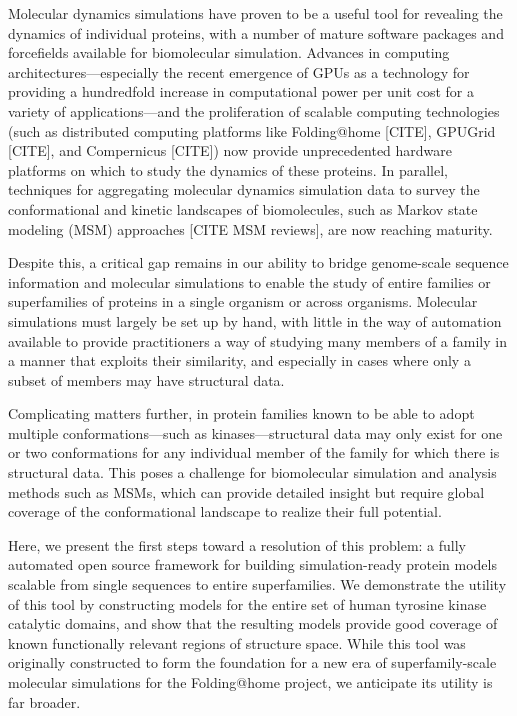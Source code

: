 \documentclass[aps,pre,twocolumn,nofootinbib,superscriptaddress,linenumbers]{revtex4-1}
\begin{document}
Molecular dynamics simulations have proven to be a useful tool for revealing the dynamics of individual proteins, with a number of mature software packages and forcefields available for biomolecular simulation.
Advances in computing architectures---especially the recent emergence of GPUs as a technology for providing a hundredfold increase in computational power per unit cost for a variety of applications---and the proliferation of scalable computing technologies (such as distributed computing platforms like Folding@home [CITE], GPUGrid [CITE], and Compernicus [CITE]) now provide unprecedented hardware platforms on which to study the dynamics of these proteins.
In parallel, techniques for aggregating molecular dynamics simulation data to survey the conformational and kinetic landscapes of biomolecules, such as Markov state modeling (MSM) approaches [CITE MSM reviews], are now reaching maturity.

Despite this, a critical gap remains in our ability to bridge genome-scale sequence information and molecular simulations to enable the study of entire families or superfamilies of proteins in a single organism or across organisms. 
Molecular simulations must largely be set up by hand, with little in the way of automation available to provide practitioners a way of studying many members of a family in a manner that exploits their similarity, and especially in cases where only a subset of members may have structural data.

Complicating matters further, in protein families known to be able to adopt multiple conformations---such as kinases---structural data may only exist for one or two conformations for any individual member of the family for which there is structural data.
This poses a challenge for biomolecular simulation and analysis methods such as MSMs, which can provide detailed insight but require global coverage of the conformational landscape to realize their full potential.

Here, we present the first steps toward a resolution of this problem: a fully automated open source framework for building simulation-ready protein models scalable from single sequences to entire superfamilies.
We demonstrate the utility of this tool by constructing models for the entire set of human tyrosine kinase catalytic domains, and show that the resulting models provide good coverage of known functionally relevant regions of structure space.
While this tool was originally constructed to form the foundation for a new era of superfamily-scale molecular simulations for the Folding@home project, we anticipate its utility is far broader.
\end{document}
